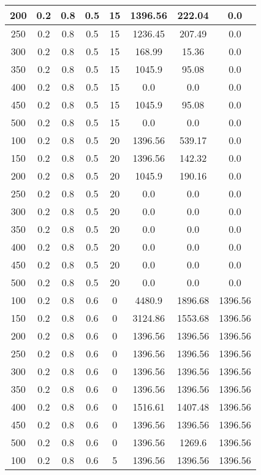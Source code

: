 \documentclass[a4paper, 12pt]{extreport}
\begin{document}
\begin{itemize}
\begin{longtable}{|c|c|c|c|c|c|c|c|}
			200 & 0.2 & 0.8 & 0.5 & 15 & 1396.56 & 222.04 & 0.0 \\\hline
			250 & 0.2 & 0.8 & 0.5 & 15 & 1236.45 & 207.49 & 0.0 \\\hline
			300 & 0.2 & 0.8 & 0.5 & 15 & 168.99 & 15.36 & 0.0 \\\hline
			350 & 0.2 & 0.8 & 0.5 & 15 & 1045.9 & 95.08 & 0.0 \\\hline
			400 & 0.2 & 0.8 & 0.5 & 15 & 0.0 & 0.0 & 0.0 \\\hline
			450 & 0.2 & 0.8 & 0.5 & 15 & 1045.9 & 95.08 & 0.0 \\\hline
			500 & 0.2 & 0.8 & 0.5 & 15 & 0.0 & 0.0 & 0.0 \\\hline
			100 & 0.2 & 0.8 & 0.5 & 20 & 1396.56 & 539.17 & 0.0 \\\hline
			150 & 0.2 & 0.8 & 0.5 & 20 & 1396.56 & 142.32 & 0.0 \\\hline
			200 & 0.2 & 0.8 & 0.5 & 20 & 1045.9 & 190.16 & 0.0 \\\hline
			250 & 0.2 & 0.8 & 0.5 & 20 & 0.0 & 0.0 & 0.0 \\\hline
			300 & 0.2 & 0.8 & 0.5 & 20 & 0.0 & 0.0 & 0.0 \\\hline
			350 & 0.2 & 0.8 & 0.5 & 20 & 0.0 & 0.0 & 0.0 \\\hline
			400 & 0.2 & 0.8 & 0.5 & 20 & 0.0 & 0.0 & 0.0 \\\hline
			450 & 0.2 & 0.8 & 0.5 & 20 & 0.0 & 0.0 & 0.0 \\\hline
			500 & 0.2 & 0.8 & 0.5 & 20 & 0.0 & 0.0 & 0.0 \\\hline
			100 & 0.2 & 0.8 & 0.6 & 0 & 4480.9 & 1896.68 & 1396.56 \\\hline
			150 & 0.2 & 0.8 & 0.6 & 0 & 3124.86 & 1553.68 & 1396.56 \\\hline
			200 & 0.2 & 0.8 & 0.6 & 0 & 1396.56 & 1396.56 & 1396.56 \\\hline
			250 & 0.2 & 0.8 & 0.6 & 0 & 1396.56 & 1396.56 & 1396.56 \\\hline
			300 & 0.2 & 0.8 & 0.6 & 0 & 1396.56 & 1396.56 & 1396.56 \\\hline
			350 & 0.2 & 0.8 & 0.6 & 0 & 1396.56 & 1396.56 & 1396.56 \\\hline
			400 & 0.2 & 0.8 & 0.6 & 0 & 1516.61 & 1407.48 & 1396.56 \\\hline
			450 & 0.2 & 0.8 & 0.6 & 0 & 1396.56 & 1396.56 & 1396.56 \\\hline
			500 & 0.2 & 0.8 & 0.6 & 0 & 1396.56 & 1269.6 & 1396.56 \\\hline
			100 & 0.2 & 0.8 & 0.6 & 5 & 1396.56 & 1396.56 & 1396.56 \\\hline

\end{longtable}
\end{itemize}
\end{document}
